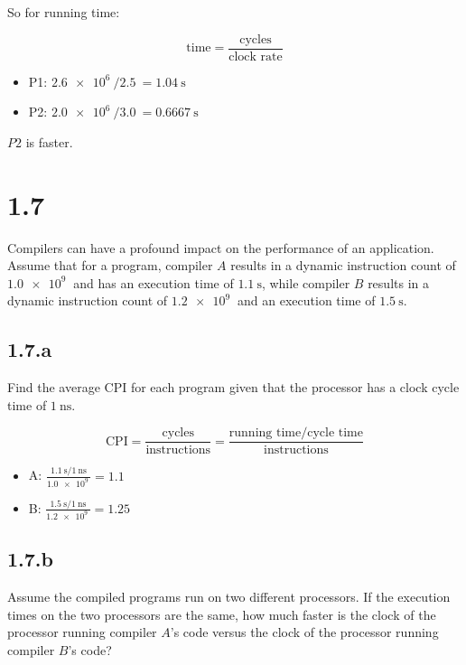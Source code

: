 \documentclass[paper=a4, fontsize=11pt]{scrartcl} %
\begin{document}
So for running time:

$$\text{time} = \frac{\text{cycles}}{\text{clock rate}}$$

\begin{itemize}
\item{P1:} $\SI{2.6e6}{} / \SI{2.5}{} = \SI{1.04}{\second}$
\item{P2:} $\SI{2.0e6}{} / \SI{3.0}{} = \SI{0.6667}{\second}$
\end{itemize}

$P2$ is faster.

\pagebreak

\section{1.7}

\begin{fancyquotes}
  Compilers can have a profound impact on the performance of an
  application. Assume that for a program, compiler $A$ results in a
  dynamic instruction count of $\SI{1.0e9}{}$ and has an execution
  time of $\SI{1.1}{\second}$, while compiler $B$ results in a dynamic
  instruction count of $\SI{1.2e9}{}$ and an execution time of
  $\SI{1.5}{\second}$.
\end{fancyquotes}

\subsection{1.7.a}
\begin{fancyquotes}
  Find the average CPI for each program given that the processor has
  a clock cycle time of $\SI{1}{\nano\second}$.
\end{fancyquotes}

$$\text{CPI} = \frac{\text{cycles}}{\text{instructions}}
= \frac{\text{running time} /
  \text{cycle time}}{\text{instructions}}$$

\begin{itemize}
\item{A:} $\frac{\SI{1.1}{\second} /
    \SI{1}{\nano\second}}{\SI{1.0e9}{}} = 1.1$
\item{B:} $\frac{\SI{1.5}{\second} /
    \SI{1}{\nano\second}}{\SI{1.2e9}{}} = 1.25$
\end{itemize}

\subsection{1.7.b}
\begin{fancyquotes}
  Assume the compiled programs run on two different processors. If
  the execution times on the two processors are the same, how much
  faster is the clock of the processor running compiler $A$'s code
  versus the clock of the processor running compiler $B$'s code?
\end{fancyquotes}
\end{document}
